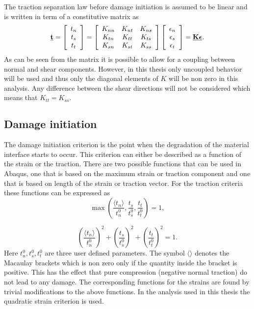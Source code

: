 \documentclass[grain_boundary_law.tex]{subfiles}
\begin{document}
The traction separation law before damage initiation is assumed to be linear and is written in term of a constitutive matrix as
 \[ \vec{t} = 
 \left[
\begin{array}{c c c}
t_n\\
t_s\\
t_t \\
\end{array} \right]
=
\left[
\begin{array}{c c c}
K_{nn} & K_{nt} & K_{ns} \\
K_{tn} & K_{tt} & K_{ts} \\
K_{sn} & K_{st} & K_{ss} \\
\end{array} \right]
 \left[
\begin{array}{c c c}
\epsilon_n\\
\epsilon_s\\
\epsilon_t \\
\end{array} \right]
= \vec{K} \vec{\epsilon}.
\]
%
As can be seen from the matrix it is possible to allow for a coupling between normal and shear components. However, in this thesis only uncoupled behavior will be used and thus only the diagonal elements of $K$ will be non zero in this analysis. Any difference between the shear directions will not be considered which means that $K_{tt} = K_{ss}$.

\subsection{Damage initiation}

The damage initiation criterion is the point when the degradation of the material interface starts to occur. This criterion can either be described as a function of the strain or the traction. There are two possible functions that can be used in Abaqus, one that is based on the maximum strain or traction component and one that is based on length of the strain or traction vector. For the traction criteria these functions can be expressed as
%
\[ \max \left( \frac{\langle t_n \rangle}{t_n^0} ,\frac{ t_s }{t_s^0} ,  \frac{ t_t }{t_t^0}  \right) = 1,  \] 

\[  \left( \frac{\langle t_n \rangle}{t_n^0} \right)^2 +   \left( \frac{ t_s }{t_s^0} \right)^2 +   \left( \frac{ t_t }{t_t^0} \right)^2 = 1.   \]	
%
Here $t_n^0, t_s^0, t_t^0$ are three user defined parameters. The symbol $\langle \rangle$ denotes the Macaulay brackets which is non zero only if the quantity inside the bracket is positive. This has the effect that pure compression (negative normal traction) do not lead to any damage. The corresponding functions for the strains are found by trivial modifications to the above functions. In the analysis used in this thesis the quadratic strain criterion is used. 
\end{document}
